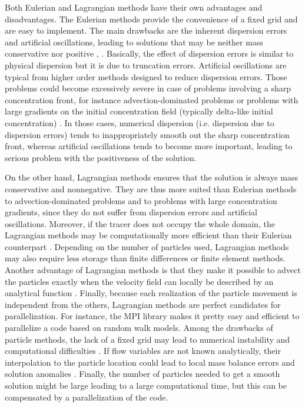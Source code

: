 Both Eulerian and Lagrangian methods have their own advantages and disadvantages. The Eulerian methods provide the convenience of a fixed grid and are easy to implement. The main drawbacks are the inherent dispersion errors and artificial oscillations, leading to solutions that may be neither mass conservative nor positive \cite{stijn1987positive}, \cite{yang1998accuracy}. Basically, the effect of dispersion errors is similar to physical dispersion but it is due to truncation errors. Artificial oscillations are typical from higher order methods designed to reduce dispersion errors. Those problems could become excessively severe in case of problems involving a sharp concentration front, for instance advection-dominated problems or problems with large gradients on the initial concentration field (typically delta-like initial concentration) \cite{zheng2002applied}. In those cases, numerical dispersion (i.e. dispersion due to dispersion errors) tends to inappropriately smooth out the sharp concentration front, whereas artificial oscillations tends to become more important, leading to serious problem with the positiveness of the solution. 

On the other hand, Lagrangian methods ensures that the solution is always mass conservative and nonnegative. They are thus more suited than Eulerian methods to advection-dominated problems and to problems with large concentration gradients, since they do not suffer from dispersion errors and artificial oscillations. Moreover, if the tracer does not occupy the whole domain, the Lagrangian methods may be computationally more efficient than their Eulerian counterpart \cite{hunter1987application}. Depending on the number of particles used, Lagrangian methods may also require less storage than finite differences or finite element methods. Another advantage of Lagrangian methods is that they make it possible to advect the particles exactly when  the velocity field can locally be described by an analytical function \cite{hunter1993use}. Finally, because each realization of the particle movement is independent from the others, Lagrangian methods are perfect candidates for parallelization. For instance, the MPI library makes it pretty easy and efficient to parallelize a code based on random walk models. Among the drawbacks of particle methods, the lack of a fixed grid may lead to numerical instability and computational difficulties \cite{yeh1990lagrangian}. If flow variables are not known analytically, their interpolation to the particle location could lead to local mass balance errors and solution anomalies \cite{labolle1996random}. Finally, the number of particles needed to get a smooth solution might be large leading to a large computational time, but this can be compensated by a parallelization of the code.

